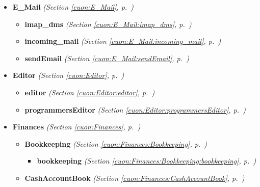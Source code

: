 \begin{itemize}
\begin{itemize}
  \end{itemize}
\item \textbf{E\_Mail}
  \textit{(Section \ref{cuon:E_Mail}, p.~\pageref{cuon:E_Mail})}

  \begin{itemize}
\setlength{\parskip}{0ex}
    \item \textbf{imap\_dms}
  \textit{(Section \ref{cuon:E_Mail:imap_dms}, p.~\pageref{cuon:E_Mail:imap_dms})}

    \item \textbf{incoming\_mail}
  \textit{(Section \ref{cuon:E_Mail:incoming_mail}, p.~\pageref{cuon:E_Mail:incoming_mail})}

    \item \textbf{sendEmail}
  \textit{(Section \ref{cuon:E_Mail:sendEmail}, p.~\pageref{cuon:E_Mail:sendEmail})}

  \end{itemize}
\item \textbf{Editor}
  \textit{(Section \ref{cuon:Editor}, p.~\pageref{cuon:Editor})}

  \begin{itemize}
\setlength{\parskip}{0ex}
    \item \textbf{editor}
  \textit{(Section \ref{cuon:Editor:editor}, p.~\pageref{cuon:Editor:editor})}

    \item \textbf{programmersEditor}
  \textit{(Section \ref{cuon:Editor:programmersEditor}, p.~\pageref{cuon:Editor:programmersEditor})}

  \end{itemize}
\item \textbf{Finances}
  \textit{(Section \ref{cuon:Finances}, p.~\pageref{cuon:Finances})}

  \begin{itemize}
\setlength{\parskip}{0ex}
    \item \textbf{Bookkeeping}
  \textit{(Section \ref{cuon:Finances:Bookkeeping}, p.~\pageref{cuon:Finances:Bookkeeping})}

      \begin{itemize}
    \setlength{\parskip}{0ex}
        \item \textbf{bookkeeping}
  \textit{(Section \ref{cuon:Finances:Bookkeeping:bookkeeping}, p.~\pageref{cuon:Finances:Bookkeeping:bookkeeping})}

      \end{itemize}
    \item \textbf{CashAccountBook}
  \textit{(Section \ref{cuon:Finances:CashAccountBook}, p.~\pageref{cuon:Finances:CashAccountBook})}


\end{itemize}
\end{itemize}
